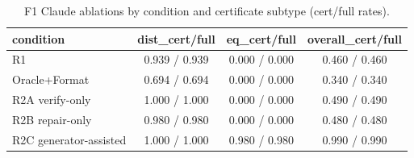 \begin{table}[t]
\centering
\caption{F1 Claude ablations by condition and certificate subtype (cert/full rates).}
\label{tab:f1-ablations}
\begin{tabular}{lccc}
\toprule
condition & dist\_cert/full & eq\_cert/full & overall\_cert/full \\
\midrule
R1 & 0.939 / 0.939 & 0.000 / 0.000 & 0.460 / 0.460 \\
Oracle+Format & 0.694 / 0.694 & 0.000 / 0.000 & 0.340 / 0.340 \\
R2A verify-only & 1.000 / 1.000 & 0.000 / 0.000 & 0.490 / 0.490 \\
R2B repair-only & 0.980 / 0.980 & 0.000 / 0.000 & 0.480 / 0.480 \\
R2C generator-assisted & 1.000 / 1.000 & 0.980 / 0.980 & 0.990 / 0.990 \\
\bottomrule
\end{tabular}
\end{table}